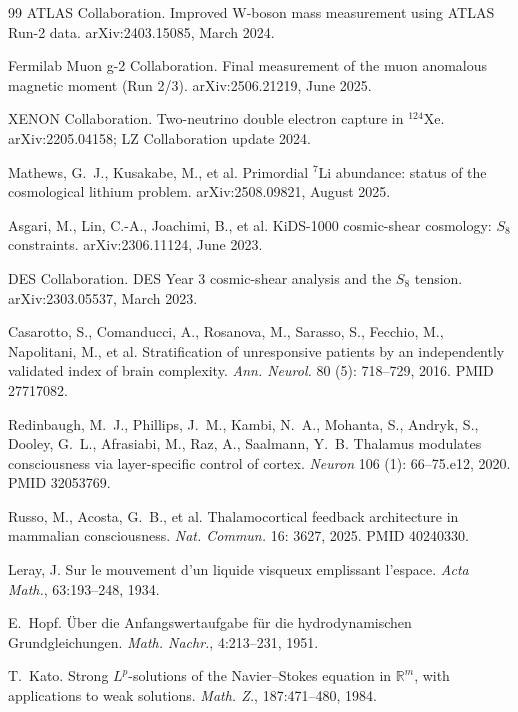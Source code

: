 \documentclass[11pt,a4paper]{amsart}
\theoremstyle{plain}
\theoremstyle{definition}
\begin{document}
\begin{thebibliography}{99}
ATLAS Collaboration.
\newblock Improved W-boson mass measurement using ATLAS Run-2 data.
\newblock arXiv:2403.15085, March 2024.

Fermilab Muon g-2 Collaboration.
\newblock Final measurement of the muon anomalous magnetic moment (Run 2/3).
\newblock arXiv:2506.21219, June 2025.

XENON Collaboration.
\newblock Two-neutrino double electron capture in ${}^{124}$Xe.
\newblock arXiv:2205.04158; LZ Collaboration update 2024.

Mathews, G.~J., Kusakabe, M., et al.
\newblock Primordial $^7$Li abundance: status of the cosmological lithium problem.
\newblock arXiv:2508.09821, August 2025.

Asgari, M., Lin, C.-A., Joachimi, B., et al.
\newblock KiDS-1000 cosmic-shear cosmology: $S_8$ constraints.
\newblock arXiv:2306.11124, June 2023.

DES Collaboration.
\newblock DES Year 3 cosmic-shear analysis and the $S_8$ tension.
\newblock arXiv:2303.05537, March 2023.

Casarotto, S., Comanducci, A., Rosanova, M., Sarasso, S., Fecchio, M., Napolitani, M., et al.
\newblock Stratification of unresponsive patients by an independently validated index of brain complexity.
\newblock \emph{Ann. Neurol.} 80 (5): 718--729, 2016. PMID 27717082.

Redinbaugh, M.~J., Phillips, J.~M., Kambi, N.~A., Mohanta, S., Andryk, S., Dooley, G.~L., Afrasiabi, M., Raz, A., Saalmann, Y.~B.
\newblock Thalamus modulates consciousness via layer-specific control of cortex.
\newblock \emph{Neuron} 106 (1): 66--75.e12, 2020. PMID 32053769.

Russo, M., Acosta, G.~B., et al.
\newblock Thalamocortical feedback architecture in mammalian consciousness.
\newblock \emph{Nat. Commun.} 16: 3627, 2025. PMID 40240330.

Leray, J.
\newblock Sur le mouvement d'un liquide visqueux emplissant l'espace.
\newblock \emph{Acta Math.}, 63:193--248, 1934.

E.~Hopf.
\newblock \"Uber die Anfangswertaufgabe f\"ur die hydrodynamischen Grundgleichungen.
\newblock \emph{Math. Nachr.}, 4:213--231, 1951.

T.~Kato.
\newblock Strong $L^p$-solutions of the Navier--Stokes equation in $\mathbb{R}^m$, with applications to weak solutions.
\newblock \emph{Math. Z.}, 187:471--480, 1984.


\end{thebibliography}
\end{document}
